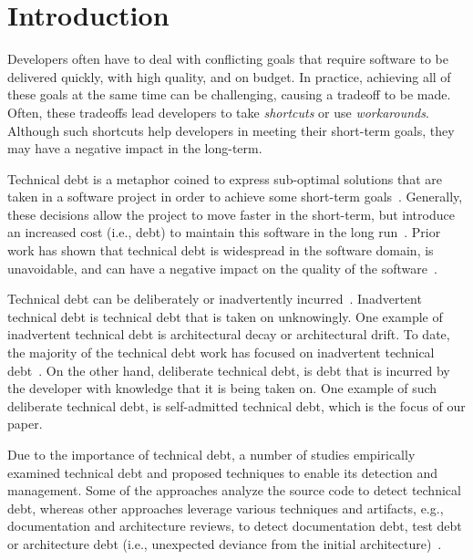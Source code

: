 
\section{Introduction}
\label{chap4:sec:introduction}

Developers often have to deal with conflicting goals that require software to be delivered quickly, with high quality, and on budget. In practice, achieving all of these goals at the same time can be challenging, causing a tradeoff to be made. Often, these tradeoffs lead developers to take \emph{shortcuts} or use \emph{workarounds}. Although such shortcuts help developers in meeting their short-term goals, they may have a negative impact in the long-term.

Technical debt is a metaphor coined to express sub-optimal solutions that are taken in a software project in order to achieve some short-term goals~\cite{Cunningham1992WPM}. Generally, these decisions allow the project to move faster in the short-term, but introduce an increased cost (i.e., debt) to maintain this software in the long run~\cite{Seaman2011,Kruchten2013IWMTD}.  Prior work has shown that technical debt is widespread in the software domain, is unavoidable, and can have a negative impact on the quality of the software~\cite{Lim2012Software}. 

Technical debt can be deliberately or inadvertently incurred~\cite{MartinFowler:TechnicalDebtQuadrant}. Inadvertent technical debt is technical debt that is taken on unknowingly. One example of inadvertent technical debt is architectural decay or architectural drift. To date, the majority of the technical debt work has focused on inadvertent technical debt~\cite{Nord2012WICSA}. On the other hand, deliberate technical debt, is debt that is incurred by the developer with knowledge that it is being taken on. One example of such deliberate technical debt, is self-admitted technical debt, which is the focus of our paper.

Due to the importance of technical debt, a number of studies empirically examined technical debt and proposed techniques to enable its detection and management. Some of the approaches analyze the source code to detect technical debt, whereas other approaches leverage various techniques and artifacts, e.g., documentation and architecture reviews, to detect documentation debt, test debt or architecture debt (i.e., unexpected deviance from the initial architecture)~\cite{Alves2016IST,Xiao2016ICSE}.

